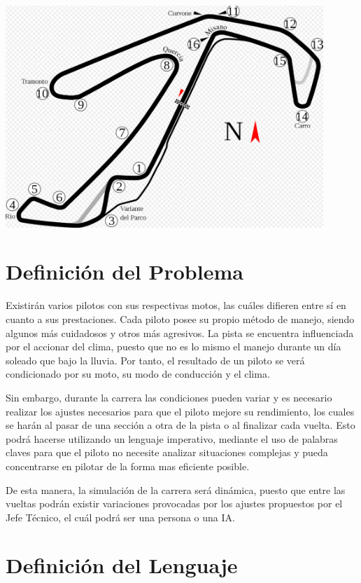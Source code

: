 \documentclass[12pt, letterpaper,spanish]{article}
\theoremstyle{definition}
\theoremstyle{remark}
\begin{document}
	\begin{center}
		\includegraphics[width = 12cm]{circuito} 
	\end{center}
	
\section{Definición del Problema}
	Existirán varios pilotos con sus respectivas motos, las cuáles difieren entre sí en cuanto a sus prestaciones. Cada piloto posee su propio método de manejo, siendo algunos más cuidadosos y otros más agresivos. La pista se encuentra influenciada por el accionar del clima, puesto que no es lo mismo el manejo durante un día soleado que bajo la lluvia. Por tanto, el resultado de un piloto se verá condicionado por su moto, su modo de conducción y el clima.\par
	Sin embargo, durante la carrera las condiciones pueden variar y es necesario realizar los ajustes necesarios para que el piloto mejore su rendimiento, los cuales se harán al pasar de una sección a otra de la pista o al finalizar cada vuelta. Esto podrá hacerse utilizando un lenguaje imperativo, mediante el uso de palabras claves para que el piloto no necesite analizar situaciones complejas y pueda concentrarse en pilotar de la forma mas eficiente posible.\par
	De esta manera, la simulación de la carrera será dinámica, puesto que entre las vueltas podrán existir variaciones provocadas por los ajustes propuestos por el Jefe Técnico, el cuál podrá ser una persona o una IA.\par
	
\section{Definición del Lenguaje}\cite{conferenciasC}\cite{ullman}
\end{document}
